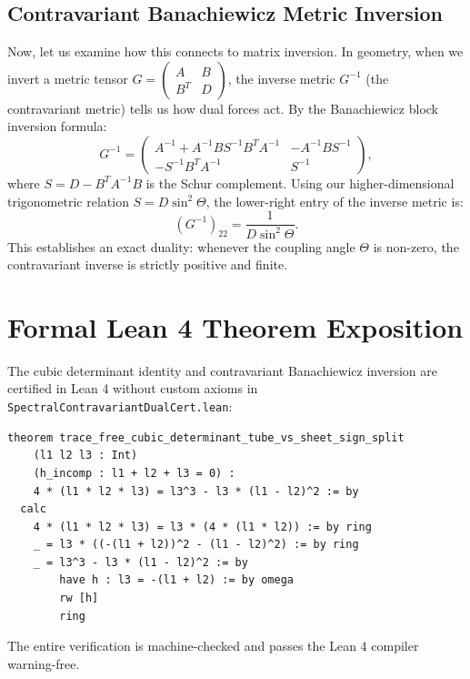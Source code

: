 \documentclass[11pt,a4paper]{article}
\theoremstyle{definition}
\begin{document}
\subsection{Contravariant Banachiewicz Metric Inversion}
Now, let us examine how this connects to matrix inversion. In geometry, when we invert a metric tensor $G = \begin{pmatrix} A & B \\ B^T & D \end{pmatrix}$, the inverse metric $G^{-1}$ (the contravariant metric) tells us how dual forces act. By the Banachiewicz block inversion formula:
\begin{equation}
G^{-1} = \begin{pmatrix} A^{-1} + A^{-1} B S^{-1} B^T A^{-1} & -A^{-1} B S^{-1} \\ -S^{-1} B^T A^{-1} & S^{-1} \end{pmatrix},
\end{equation}
where $S = D - B^T A^{-1} B$ is the Schur complement. Using our higher-dimensional trigonometric relation $S = D \sin^2\Theta$, the lower-right entry of the inverse metric is:
\begin{equation}
(G^{-1})_{22} = \frac{1}{D \sin^2\Theta}.
\end{equation}
This establishes an exact duality: whenever the coupling angle $\Theta$ is non-zero, the contravariant inverse is strictly positive and finite.


\section{Formal Lean 4 Theorem Exposition}

The cubic determinant identity and contravariant Banachiewicz inversion are certified in Lean 4 without custom axioms in \texttt{SpectralContravariantDualCert.lean}:

\begin{lstlisting}[language=Lean4]
theorem trace_free_cubic_determinant_tube_vs_sheet_sign_split
    (l1 l2 l3 : Int)
    (h_incomp : l1 + l2 + l3 = 0) :
    4 * (l1 * l2 * l3) = l3^3 - l3 * (l1 - l2)^2 := by
  calc
    4 * (l1 * l2 * l3) = l3 * (4 * (l1 * l2)) := by ring
    _ = l3 * ((-(l1 + l2))^2 - (l1 - l2)^2) := by ring
    _ = l3^3 - l3 * (l1 - l2)^2 := by
        have h : l3 = -(l1 + l2) := by omega
        rw [h]
        ring
\end{lstlisting}

The entire verification is machine-checked and passes the Lean 4 compiler warning-free.
\end{document}
